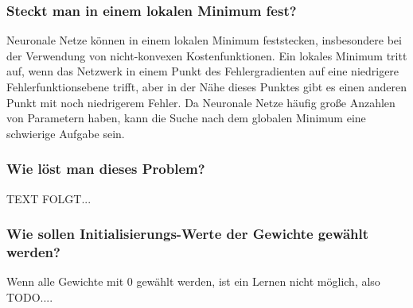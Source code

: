 \subsubsection{Steckt man in einem lokalen Minimum fest?}\label{subsec:gradientenverfahren:fehlerquellen_lokalen_minimum}
  Neuronale Netze können in einem lokalen Minimum feststecken, insbesondere bei der Verwendung von nicht-konvexen Kostenfunktionen. Ein lokales Minimum tritt auf, wenn das Netzwerk in einem Punkt des Fehlergradienten
  auf eine niedrigere Fehlerfunktionsebene trifft, aber in der Nähe dieses Punktes gibt es einen anderen Punkt mit noch niedrigerem Fehler.
  Da Neuronale Netze häufig große Anzahlen von Parametern haben, kann die Suche nach dem globalen Minimum eine schwierige Aufgabe sein.\cite{HS97}

\subsubsection{Wie löst man dieses Problem?}\label{subsec:gradientenverfahren:fehlerquellen_problem_loesen}
  TEXT FOLGT...

  \subsubsection{Wie sollen Initialisierungs-Werte der Gewichte gewählt werden?}\label{subsec:gradientenverfahren:fehlerquellen_init_werte}
  Wenn alle Gewichte mit 0 gewählt werden, ist ein Lernen nicht möglich, also TODO....


